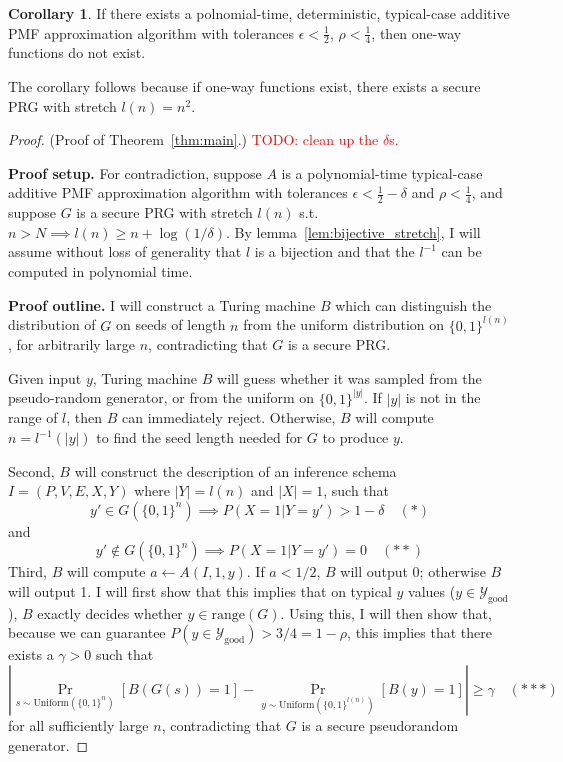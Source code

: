 \documentclass{article}
\def \Ygood{\mathcal{Y}_\text{good}}
\theoremstyle{definition}
\newtheorem{cor}[thm]{Corollary}
\theoremstyle{remark}
\begin{document}
\begin{cor}
If there exists a polnomial-time, deterministic, typical-case additive PMF approximation algorithm with tolerances $\epsilon < \frac{1}{2}$, $\rho < \frac{1}{4}$,
then one-way functions do not exist.
\end{cor}
\noindent The corollary follows because if one-way functions exist, there exists a secure PRG with stretch $l(n) = n^2$.

\begin{proof}{(Proof of Theorem~\ref{thm:main}.)} \textcolor{red}{TODO: clean up the $\delta$s.}

\medskip
\noindent \textbf{Proof setup.}
For contradiction, suppose $A$ is a polynomial-time typical-case additive PMF approximation algorithm with tolerances $\epsilon < \frac{1}{2} - \delta$ and $\rho < \frac{1}{4}$,
and suppose $G$ is a secure PRG with stretch $l(n)$ s.t. $n > N \implies l(n) \geq n + \log(1/\delta)$.
By lemma~\ref{lem:bijective_stretch}, I will assume without loss of generality that $l$ is a bijection and that the $l^{-1}$ can be computed in polynomial time.

\medskip
\noindent \textbf{Proof outline.}
I will construct a Turing machine $B$ which can distinguish the distribution of $G$ on seeds of length $n$ from the uniform distribution on $\{0, 1\}^{l(n)}$, for arbitrarily large $n$, contradicting that $G$ is a secure PRG.

Given input $y$, Turing machine $B$ will guess whether it was sampled from the pseudo-random generator, or from the uniform on $\{0, 1\}^{|y|}$.
If $|y|$ is not in the range of $l$, then $B$ can immediately reject.
Otherwise, $B$ will compute $n = l^{-1}(|y|)$ to find the seed length needed for $G$ to produce $y$.

Second, $B$ will construct the description of an inference schema $I = (P, V, E, X, Y)$ where $|Y| = l(n)$ and $|X| = 1$, such that
$$
y' \in G(\{0, 1\}^n) \implies P(X = 1 | Y = y') > 1 - \delta \quad (*)
$$
and
$$
y' \notin G(\{0, 1\}^n) \implies P(X = 1 | Y = y') = 0 \quad (**)
$$
Third, $B$ will compute $a \gets A(I, 1, y)$.
If $a < 1/2$, $B$ will output 0; otherwise $B$ will output 1.
I will first show that this implies that on typical $y$ values ($y \in \Ygood$),
$B$ exactly decides whether $y \in \text{range}(G)$.
Using this,
I will then show that, because we can guarantee $P(y \in \Ygood) > 3/4 = 1 - \rho$,
this implies that there exists a $\gamma > 0$ such that
$$
|\Pr_{s \sim \text{Uniform}(\{0, 1\}^n)}[B(G(s)) = 1] - \Pr_{y \sim \text{Uniform}(\{0, 1\}^{l(n)})}[B(y) = 1]| \geq \gamma \quad (***)
$$
for all sufficiently large $n$, contradicting that $G$ is a secure pseudorandom generator.


\end{proof}
\end{document}
